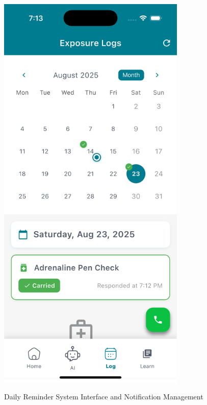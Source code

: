 \documentclass[MScCS]{uccthesis}
\begin{document}
\begin{figure}[htbp]
\begin{minipage}[b]{0.45\textwidth}
        \label{fig:pen-reminder-dialog}
    \end{minipage}
    \hfill
    \begin{minipage}[b]{0.45\textwidth}
        \centering
        \includegraphics[width=0.8\textwidth,height=0.45\textheight,keepaspectratio]{Figures/pen_reminder_log.png}
      
        \label{fig:pen-reminder-log}
    \end{minipage}
    \caption{Daily Reminder System Interface and Notification Management}
    \label{fig:reminder-system-screenshots}
\end{figure}
\end{document}
